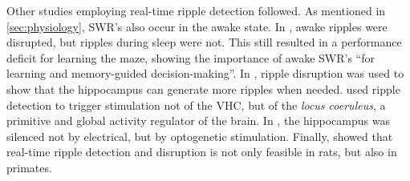 
Other studies employing real-time ripple detection followed. As mentioned in \cref{sec:physiology}, SWR's also occur in the awake state. In , awake ripples were disrupted, but ripples during sleep were not. This still resulted in a performance deficit for learning the maze, showing the importance of awake SWR's ``for learning and memory-guided decision-making''. In , ripple disruption was used to show that the hippocampus can generate more ripples when needed.  used ripple detection to trigger stimulation not of the VHC, but of the \emph{locus coeruleus}, a primitive and global activity regulator of the brain. In , the hippocampus was silenced not by electrical, but by optogenetic stimulation. Finally,  showed that real-time ripple detection and disruption is not only feasible in rats, but also in primates.
